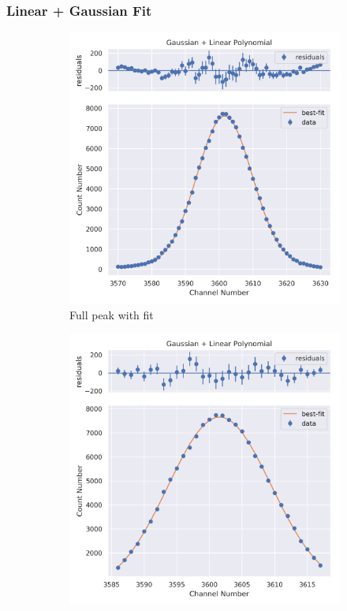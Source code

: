 \documentclass[11pt,a4paper]{article}
\begin{document}
\subsubsection{Linear + Gaussian Fit}
\begin{figure}[H]
  \centering
  \begin{subfigure}{.5\linewidth}
    \centering
    \includegraphics[width=\linewidth]{./Images/Sodium22/Linear/Linear_1_Full.png}
    \caption{Full peak with fit}
  \end{subfigure}%
  \begin{subfigure}{.5\linewidth}
    \centering
    \includegraphics[width=\linewidth]{./Images/Sodium22/Linear/Linear_1_Zoom.png}

\end{subfigure}
\end{figure}
\end{document}

